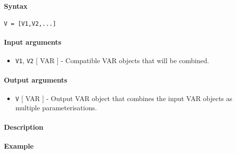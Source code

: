 


	\paragraph{Syntax}\label{syntax}

\begin{verbatim}
V = [V1,V2,...]
\end{verbatim}

\paragraph{Input arguments}\label{input-arguments}

\begin{itemize}
\itemsep1pt\parskip0pt
\item
  \texttt{V1}, \texttt{V2} {[} VAR {]} - Compatible VAR objects that
  will be combined.
\end{itemize}

\paragraph{Output arguments}\label{output-arguments}

\begin{itemize}
\itemsep1pt\parskip0pt
\item
  \texttt{V} {[} VAR {]} - Output VAR object that combines the input VAR
  objects as multiple parameterisations.
\end{itemize}

\paragraph{Description}\label{description}

\paragraph{Example}\label{example}


